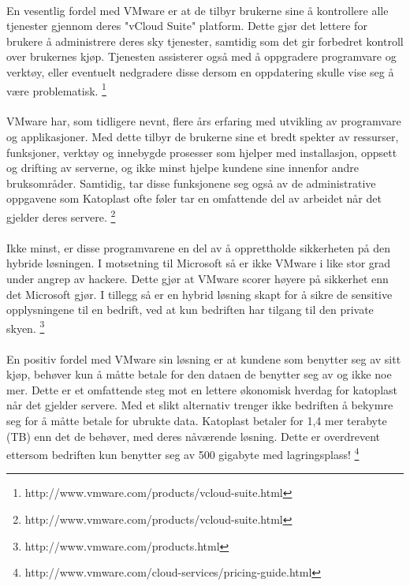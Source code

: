 \paragraph{} En vesentlig fordel med VMware er at de tilbyr brukerne sine å kontrollere alle tjenester gjennom deres  "vCloud Suite" platform. Dette gjør det lettere for brukere å administrere deres sky tjenester, samtidig som det gir forbedret kontroll over brukernes kjøp. Tjenesten assisterer også med å oppgradere programvare og verktøy, eller eventuelt nedgradere disse dersom en oppdatering skulle vise seg å være problematisk.
\footnote{http://www.vmware.com/products/vcloud-suite.html}

\paragraph{} VMware har, som tidligere nevnt, flere års erfaring med utvikling av programvare og applikasjoner. Med dette tilbyr de brukerne sine et bredt spekter av ressurser, funksjoner, verktøy og innebygde prosesser som hjelper med installasjon, oppsett og drifting av serverne, og ikke minst hjelpe kundene sine innenfor andre bruksområder. Samtidig, tar disse funksjonene seg også av de administrative oppgavene som Katoplast ofte føler tar en omfattende del av arbeidet når det gjelder deres servere. 
\footnote{http://www.vmware.com/products/vcloud-suite.html}

\paragraph{} Ikke minst, er disse programvarene en del av å opprettholde sikkerheten på den hybride løsningen. I motsetning til Microsoft så er ikke VMware i like stor grad under angrep av hackere. Dette gjør at VMware scorer høyere på sikkerhet enn det Microsoft gjør. I tillegg så er en hybrid løsning skapt for å sikre de sensitive opplysningene til en bedrift, ved at kun bedriften har tilgang til den private skyen.
\footnote{http://www.vmware.com/products.html}

\paragraph{} En positiv fordel med VMware sin løsning er at kundene som benytter seg av sitt kjøp, behøver kun å måtte betale for den dataen de benytter seg av og ikke noe mer. Dette er et omfattende steg mot en lettere økonomisk hverdag for katoplast når det gjelder servere. Med et slikt alternativ trenger ikke bedriften å bekymre seg for å måtte betale for ubrukte data. Katoplast betaler for 1,4 mer terabyte (TB) enn det de behøver, med deres nåværende løsning. Dette er overdrevent ettersom bedriften kun benytter seg av 500 gigabyte med lagringsplass!
\footnote{http://www.vmware.com/cloud-services/pricing-guide.html}

